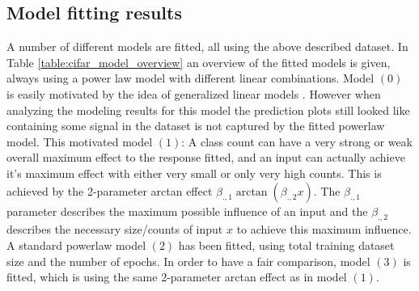 \documentclass{article} %
\begin{document}
\subsection*{Model fitting results}
A number of different models are fitted, all using the above described dataset. In Table \ref{table:cifar_model_overview} an overview of the fitted models is given, always using a power law model with different linear combinations.
Model $(0)$ is easily motivated by the idea of generalized linear models \cite{GeneralizedLinearModels}.
However when analyzing the modeling results for this model the prediction plots still looked like containing some signal in the dataset is not captured by the fitted powerlaw model.
This motivated model $(1)$: 
A class count can have a very strong or weak overall maximum effect to the response fitted, and an input can actually achieve it's maximum effect with either very small or only very high counts.
This is achieved by the 2-parameter arctan effect $\beta_{., 1} \arctan{(\beta_{., 2} x)}$. The $\beta_{.,1}$ parameter describes the maximum possible influence of an input 
and the $\beta_{., 2}$ describes the necessary size/counts of input $x$ to achieve this maximum influence.
A standard powerlaw model $(2)$ has been fitted, using total training dataset size and the number of epochs.
In order to have a fair comparison, model $(3)$ is fitted, which is using the same 2-parameter arctan effect as in model $(1)$.
\end{document}
